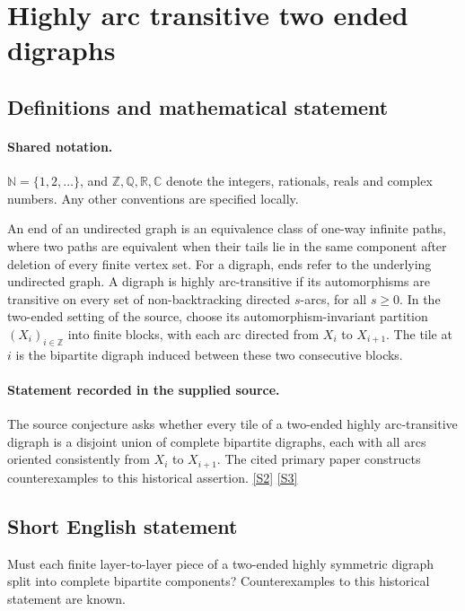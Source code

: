 \documentclass[11pt]{article}
\newcommand{\sref}[2]{\hyperlink{source:#1:#2}{[S#2]}}
\begin{document}
\section{Highly arc transitive two ended digraphs}\label{statement}

\subsection{Definitions and mathematical statement}

\paragraph{Shared notation.}$\mathbb N=\{1,2,\ldots\}$, and $\mathbb Z,\mathbb Q,\mathbb R,\mathbb C$ denote the integers, rationals, reals and complex numbers. Any other conventions are specified locally.


An end of an undirected graph is an equivalence class of one-way infinite paths, where two paths are equivalent when their tails lie in the same component after deletion of every finite vertex set. For a digraph, ends refer to the underlying undirected graph. A digraph is highly arc-transitive if its automorphisms are transitive on every set of non-backtracking directed $s$-arcs, for all $s\geq0$. In the two-ended setting of the source, choose its automorphism-invariant partition $(X_i)_{i\in\mathbb Z}$ into finite blocks, with each arc directed from $X_i$ to $X_{i+1}$. The tile at $i$ is the bipartite digraph induced between these two consecutive blocks.
\paragraph{Statement recorded in the supplied source.}
The source conjecture asks whether every tile of a two-ended highly arc-transitive digraph is a disjoint union of complete bipartite digraphs, each with all arcs oriented consistently from $X_i$ to $X_{i+1}$. The cited primary paper constructs counterexamples to this historical assertion. \sref{statement}{2} \sref{statement}{3}
\subsection{Short English statement}
Must each finite layer-to-layer piece of a two-ended highly symmetric digraph split into complete bipartite components? Counterexamples to this historical statement are known.
\end{document}
